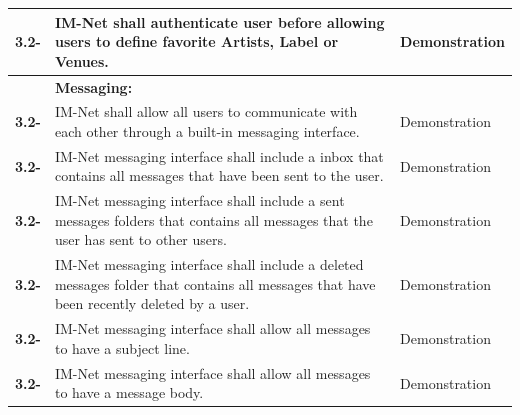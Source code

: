 \documentclass[letterpaper,12pt]{article}
\newcounter{rcounter}							%
\newcommand\rnumber{\stepcounter{rcounter}\arabic{rcounter}}
\begin{document}
{\begin{center}
\begin{tabular}{|l|p{4in}|p{2in}|}
\hline 
\textbf{3.2-\rnumber} & IM-Net shall authenticate user before allowing users to define favorite Artists, Label or Venues. & Demonstration \\ 
\hline 
& \textbf{Messaging:} & \\
\hline
\textbf{3.2-\rnumber} & IM-Net shall allow all users to communicate with each other through a built-in messaging interface. & Demonstration \\ 
\hline 
\textbf{3.2-\rnumber} & IM-Net messaging interface shall include a inbox that contains all messages that have been sent to the user. & Demonstration \\ 
\hline 
\textbf{3.2-\rnumber} & IM-Net messaging interface shall include a sent messages folders that contains all messages that the user has sent to other users. & Demonstration \\ 
\hline 
\textbf{3.2-\rnumber} & IM-Net messaging interface shall include a deleted messages folder that contains all messages that have been recently deleted by a user. & Demonstration \\ 
\textbf{3.2-\rnumber} & IM-Net messaging interface shall allow all messages to have a subject line. & Demonstration \\ 
\hline 
\textbf{3.2-\rnumber} & IM-Net messaging interface shall allow all messages to have a message body. & Demonstration \\ 
\hline 
\end{tabular} 
\end{center}

}
\end{document}
